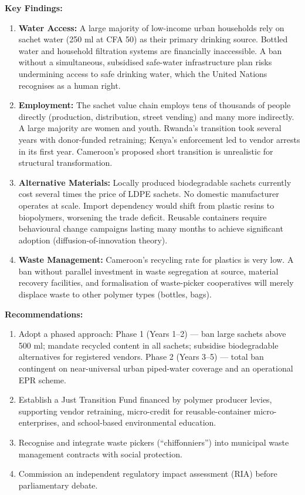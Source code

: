 \documentclass[11pt]{article}
\newcommand{\cle}[1]{{\popxbold\color{popdark}#1}}
\begin{document}
\textbf{Key Findings:}
\begin{enumerate}
    \item \textbf{Water Access:} A large majority of low-income urban households rely on sachet water (250 ml at CFA 50) as their primary drinking source. Bottled water and household filtration systems are financially inaccessible. A ban without a simultaneous, subsidised safe-water infrastructure plan risks undermining access to safe drinking water, which the United Nations recognises as a human right.
    \item \textbf{Employment:} The sachet value chain employs tens of thousands of people directly (production, distribution, street vending) and many more indirectly. A large majority are women and youth. Rwanda's transition took several years with donor-funded retraining; Kenya's enforcement led to vendor arrests in its first year. Cameroon's proposed short transition is unrealistic for structural transformation.
    \item \textbf{Alternative Materials:} Locally produced biodegradable sachets currently cost several times the price of LDPE sachets. No domestic manufacturer operates at scale. Import dependency would shift from plastic resins to biopolymers, worsening the trade deficit. Reusable containers require behavioural change campaigns lasting many months to achieve significant adoption (diffusion-of-innovation theory).
    \item \textbf{Waste Management:} Cameroon's recycling rate for plastics is very low. A ban without parallel investment in waste segregation at source, material recovery facilities, and formalisation of waste-picker cooperatives will merely displace waste to other polymer types (bottles, bags).
\end{enumerate}

\textbf{Recommendations:}
\begin{enumerate}
    \item Adopt a \cle{phased approach}: Phase 1 (Years 1--2) --- ban large sachets above 500 ml; mandate recycled content in all sachets; subsidise biodegradable alternatives for registered vendors. Phase 2 (Years 3--5) --- total ban contingent on near-universal urban piped-water coverage and an operational EPR scheme.
    \item Establish a \cle{Just Transition Fund} financed by polymer producer levies, supporting vendor retraining, micro-credit for reusable-container micro-enterprises, and school-based environmental education.
    \item Recognise and integrate waste pickers (\cle{``chiffonniers''}) into municipal waste management contracts with social protection.
    \item Commission an independent regulatory impact assessment (RIA) before parliamentary debate.
\end{enumerate}
\end{document}
